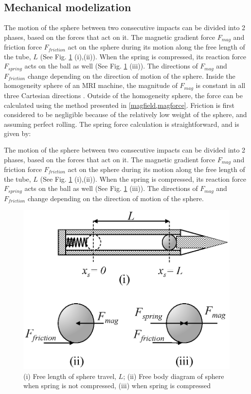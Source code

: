 \documentclass[letterpaper, 10 pt, conference]{ieeeconf}  %
\begin{document}
\subsection{Mechanical modelization}
The motion of the sphere between two consecutive impacts can be divided into 2  phases, based on the forces that act on it. The magnetic gradient force $F_{mag}$ and friction force $F_{friction}$ act on the sphere during its motion along the free length of the tube, $L$ (See Fig. \ref{FBD} (i),(ii)). When the spring is compressed, its reaction force $F_{spring}$ acts on the ball as well (See Fig. \ref{FBD} (iii)). The directions of $F_{mag}$ and $F_{friction}$  change depending on the direction of motion of the sphere. Inside the homogeneity sphere of an MRI machine, the magnitude of $F_{mag}$ is constant in all three Cartesian directions \cite{CMR:CMR20163}. Outside of the homogeneity sphere, the force can be calculated using the method presented in \cref{magfield,magforce}. Friction is first considered to be negligible because of the relatively low weight of the sphere, and assuming perfect rolling. The spring force calculation is straightforward, and is given by:

The motion of the sphere between two consecutive impacts can be divided into 2  phases, based on the forces that act on it. The magnetic gradient force $F_{mag}$ and friction force $F_{friction}$ act on the sphere during its motion along the free length of the tube, $L$ (See Fig. \ref{FBD} (i),(ii)). When the spring is compressed, its reaction force $F_{spring}$ acts on the ball as well (See Fig. \ref{FBD} (iii)). The directions of $F_{mag}$ and $F_{friction}$  change depending on the direction of motion of the sphere. 

\begin{figure}
	\includegraphics[width=\linewidth]{FBD.eps}
	\caption{(i) Free length of sphere travel, $L$; (ii) Free body diagram of sphere when spring is not compressed, (iii) when spring is compressed}
	\label{FBD}
\end{figure}
\end{document}
